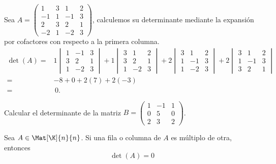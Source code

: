 \documentclass[compacto,10pt]{pubciencias-notas}
\begin{document}
\begin{ejem}
    Sea $A = 
    \begin{pmatrix}
        1 & 3 & 1 & 2 \\
        -1 & 1 & -1 & 3 \\
        2 & 3 & 2 & 1 \\
        -2 & 1 & -2 & 3
    \end{pmatrix}$, calculemos su determinante mediante la expansión por cofactores con respecto a la primera columna.
    \begin{align*}
        \det(A) = & 1
        \begin{vmatrix}
            1 & -1 & 3 \\
            3 & 2 & 1 \\
            1 & -2 & 3
        \end{vmatrix} + 1
        \begin{vmatrix}
            3 & 1 & 2 \\
            3 & 2 & 1 \\
            1 & -2 & 3
        \end{vmatrix} +2
        \begin{vmatrix}
            3 & 1 & 2 \\
            1 & -1 & 3 \\
            1 & -2 & 3
        \end{vmatrix} +2
        \begin{vmatrix}
            3 & 1 & 2 \\
            1 & -1 & 3 \\
            3 & 2 & 1
        \end{vmatrix} \\
        = & -8 + 0 + 2(7) + 2(-3) \\
        = & \, 0.
    \end{align*}
\end{ejem}

\begin{ejer} Calcular el determinante de la matriz $B = 
    \begin{pmatrix}
        1 & -1 & 1 \\
        0 & 5 & 0 \\
        2 & 3 & 2
    \end{pmatrix}$.
\end{ejer}

\begin{prop}
    Sea $A \in \Mat[\K]{n}{n}$. Si una  fila o columna de $A$ es múltiplo de otra, entonces 
    \[
        \det(A) = 0
    \]
\end{prop}
\end{document}
